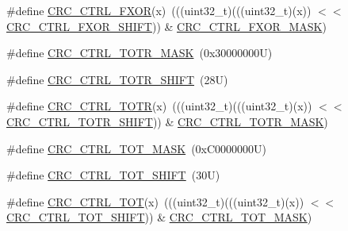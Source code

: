 \begin{DoxyCompactItemize}
\item 
\#define \mbox{\hyperlink{group___c_r_c___register___masks_ga1c2f29124fc102fe38410389a7225e64}{C\+R\+C\+\_\+\+C\+T\+R\+L\+\_\+\+F\+X\+OR}}(x)~(((uint32\+\_\+t)(((uint32\+\_\+t)(x)) $<$$<$ \mbox{\hyperlink{group___c_r_c___register___masks_ga99bb491c03e22125b5053167bf361218}{C\+R\+C\+\_\+\+C\+T\+R\+L\+\_\+\+F\+X\+O\+R\+\_\+\+S\+H\+I\+FT}})) \& \mbox{\hyperlink{group___c_r_c___register___masks_ga7c59a3459d15bbbf8ae8bbcc208a1b31}{C\+R\+C\+\_\+\+C\+T\+R\+L\+\_\+\+F\+X\+O\+R\+\_\+\+M\+A\+SK}})
\item 
\#define \mbox{\hyperlink{group___c_r_c___register___masks_ga1af35cbb29862b18aee64fd4f32bca07}{C\+R\+C\+\_\+\+C\+T\+R\+L\+\_\+\+T\+O\+T\+R\+\_\+\+M\+A\+SK}}~(0x30000000\+U)
\item 
\#define \mbox{\hyperlink{group___c_r_c___register___masks_gab309d177a917d972212c78481cf25d4d}{C\+R\+C\+\_\+\+C\+T\+R\+L\+\_\+\+T\+O\+T\+R\+\_\+\+S\+H\+I\+FT}}~(28\+U)
\item 
\#define \mbox{\hyperlink{group___c_r_c___register___masks_gad671df568418549570b651209067dcc3}{C\+R\+C\+\_\+\+C\+T\+R\+L\+\_\+\+T\+O\+TR}}(x)~(((uint32\+\_\+t)(((uint32\+\_\+t)(x)) $<$$<$ \mbox{\hyperlink{group___c_r_c___register___masks_gab309d177a917d972212c78481cf25d4d}{C\+R\+C\+\_\+\+C\+T\+R\+L\+\_\+\+T\+O\+T\+R\+\_\+\+S\+H\+I\+FT}})) \& \mbox{\hyperlink{group___c_r_c___register___masks_ga1af35cbb29862b18aee64fd4f32bca07}{C\+R\+C\+\_\+\+C\+T\+R\+L\+\_\+\+T\+O\+T\+R\+\_\+\+M\+A\+SK}})
\item 
\#define \mbox{\hyperlink{group___c_r_c___register___masks_ga66da08ca8e22cd72c74e4b3cf53df7dd}{C\+R\+C\+\_\+\+C\+T\+R\+L\+\_\+\+T\+O\+T\+\_\+\+M\+A\+SK}}~(0x\+C0000000\+U)
\item 
\#define \mbox{\hyperlink{group___c_r_c___register___masks_gaad1005ea5864ca6795a27b3f7db38ea6}{C\+R\+C\+\_\+\+C\+T\+R\+L\+\_\+\+T\+O\+T\+\_\+\+S\+H\+I\+FT}}~(30\+U)
\item 
\#define \mbox{\hyperlink{group___c_r_c___register___masks_gae8b301db96fe11408f82b997c5452bf7}{C\+R\+C\+\_\+\+C\+T\+R\+L\+\_\+\+T\+OT}}(x)~(((uint32\+\_\+t)(((uint32\+\_\+t)(x)) $<$$<$ \mbox{\hyperlink{group___c_r_c___register___masks_gaad1005ea5864ca6795a27b3f7db38ea6}{C\+R\+C\+\_\+\+C\+T\+R\+L\+\_\+\+T\+O\+T\+\_\+\+S\+H\+I\+FT}})) \& \mbox{\hyperlink{group___c_r_c___register___masks_ga66da08ca8e22cd72c74e4b3cf53df7dd}{C\+R\+C\+\_\+\+C\+T\+R\+L\+\_\+\+T\+O\+T\+\_\+\+M\+A\+SK}})
\end{DoxyCompactItemize}
